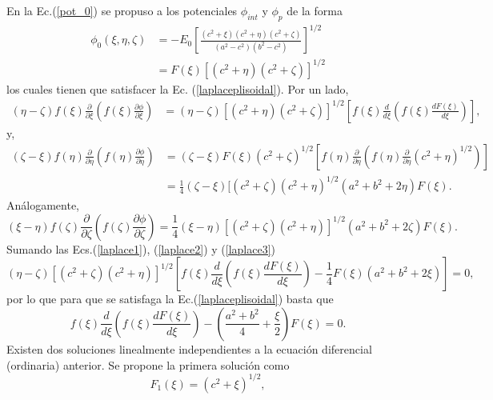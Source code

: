 \documentclass[paper=letter, fontsize=12pt,]{article}
\begin{document}
En la Ec.(\ref{pot_0}) se propuso a los potenciales $\phi_{int}$ y $\phi_p$ de la forma
\begin{align}
    \phi_0(\xi,\eta,\zeta)&=-E_0\left[\frac{(c^2+\xi)(c^2+\eta)(c^2+\zeta)}{(a^2-c^2)(b^2-c^2)}\right]^{1/2}\nonumber\\
    &=F(\xi)[(c^2+\eta)(c^2+\zeta)]^{1/2}
    \label{phi0 con F}
\end{align}
los cuales tienen que satisfacer la Ec. (\ref{laplaceplisoidal}). Por un lado, 
\begin{align}
     (\eta-\zeta)f(\xi)\frac{\partial}{\partial\xi}\left(f(\xi)\frac{\partial\phi}{\partial\xi}\right)&= (\eta-\zeta)[(c^2+\eta)(c^2+\zeta)]^{1/2}\left[f(\xi)\frac{d}{d\xi}\left(f(\xi)\frac{ d F(\xi)}{d\xi}\right)\right],\label{laplace1}
\end{align}
y,
\begin{align}
    (\zeta-\xi)f(\eta)\frac{\partial}{\partial\eta}\left(f(\eta)\frac{\partial\phi}{\partial\eta}\right)&=(\zeta-\xi)F(\xi)(c^2+\zeta)^{1/2}\left[f(\eta)\frac{\partial}{\partial\eta}\left(f(\eta)\frac{\partial}{\partial\eta}(c^2+\eta)^{1/2}\right)\right]\nonumber\\
    &=\frac{1}{4}(\zeta-\xi)[(c^2+\zeta)(c^2+\eta)^{1/2}(a^2+b^2+2\eta)F(\xi).\label{laplace2}
\end{align}
Análogamente,
\begin{equation}
    (\xi-\eta)f(\zeta)\frac{\partial}{\partial\zeta}\left(f(\zeta)\frac{\partial\phi}{\partial\zeta}\right)=\frac{1}{4}(\xi-\eta)[(c^2+\zeta)(c^2+\eta)]^{1/2}(a^2+b^2+2\zeta)F(\xi).\label{laplace3}
\end{equation}
Sumando las Ecs.(\ref{laplace1}), (\ref{laplace2}) y (\ref{laplace3}) 
\begin{equation}
  (\eta-\zeta)[(c^2+\zeta)(c^2+\eta)]^{1/2}\left[f(\xi)\frac{d}{d\xi}\left(f(\xi)\frac{ d F(\xi)}{d\xi}\right)-\frac{1}{4}F(\xi)(a^2+b^2+2\xi)\right]=0,
\end{equation}
por lo que para que se satisfaga la Ec.(\ref{laplaceplisoidal}) basta que
\begin{equation}
    f(\xi)\frac{d}{d\xi}\left(f(\xi)\frac{ d F(\xi)}{d\xi}\right)-\left(\frac{a^2+b^2}{4}+\frac{\xi}{2}\right)F(\xi)=0.
\end{equation}
Existen dos soluciones linealmente independientes a la ecuación diferencial (ordinaria) anterior. Se propone
la primera solución como
\begin{equation}
    F_1(\xi)=(c^2+\xi)^{1/2},
    \label{F1}
\end{equation}
\end{document}
